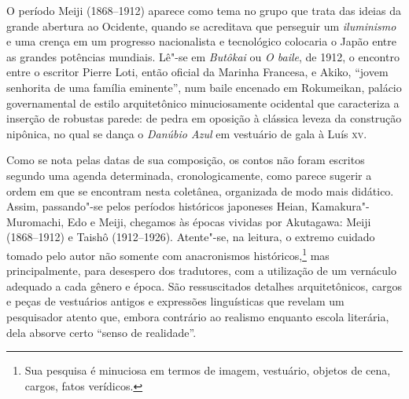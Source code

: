O período Meiji (1868--1912) aparece como tema no grupo que trata das
ideias da grande abertura ao Ocidente, quando se acreditava que
perseguir um \textit{iluminismo} e uma crença em um progresso nacionalista e
tecnológico colocaria o Japão entre as grandes potências mundiais.
Lê"-se em \textit{Butôkai} ou \textit{O baile}, de 1912, o encontro entre
o escritor Pierre Loti, então oficial da Marinha Francesa, e Akiko,
``jovem senhorita de uma família eminente'', num baile encenado em
Rokumeikan, palácio governamental de estilo arquitetônico
minuciosamente ocidental que caracteriza a inserção de robustas parede:
de pedra em oposição à clássica leveza da construção nipônica, no qual
se dança o \textit{Danúbio Azul} em vestuário de gala à Luís \textsc{xv}.

Como se nota pelas datas de sua composição, os contos não foram escritos
segundo uma agenda determinada, cronologicamente, como parece sugerir a
ordem em que se encontram nesta coletânea, organizada de modo mais
didático. Assim, passando"-se pelos períodos históricos japoneses Heian,
Kamakura"-Muromachi, Edo e Meiji, chegamos às épocas vividas por
Akutagawa: Meiji (1868--1912) e Taishô (1912--1926). Atente"-se, na
leitura, o extremo cuidado tomado pelo autor não somente com
anacronismos históricos,\footnote{Sua pesquisa é minuciosa em termos de imagem,
vestuário, objetos de cena, cargos, fatos verídicos.} mas 
principalmente, para desespero dos tradutores, com a utilização de um
vernáculo adequado a cada gênero e época. São ressuscitados detalhes
arquitetônicos, cargos e peças de vestuários antigos e expressões
linguísticas que revelam um pesquisador atento que, embora contrário ao
realismo enquanto escola literária, dela absorve certo ``senso de realidade''.

